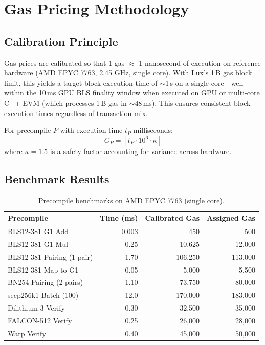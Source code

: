 \section{Gas Pricing Methodology}
\label{sec:gas}

\subsection{Calibration Principle}

Gas prices are calibrated so that 1 gas $\approx$ 1 nanosecond of execution on reference hardware (AMD EPYC 7763, 2.45 GHz, single core). With Lux's 1\,B gas block limit, this yields a target block execution time of $\sim$1\,s on a single core---well within the 10\,ms GPU BLS finality window when executed on GPU or multi-core C++ EVM (which processes 1\,B gas in $\sim$48\,ms). This ensures consistent block execution times regardless of transaction mix.

\begin{definition}
For precompile $P$ with execution time $t_P$ milliseconds:
\begin{equation}
    G_P = \left\lfloor t_P \cdot 10^6 \cdot \kappa \right\rfloor
\end{equation}
where $\kappa = 1.5$ is a safety factor accounting for variance across hardware.
\end{definition}

\subsection{Benchmark Results}

\begin{table}[H]
\centering
\caption{Precompile benchmarks on AMD EPYC 7763 (single core).}
\label{tab:benchmarks}
\begin{tabular}{lrrr}
\toprule
\textbf{Precompile} & \textbf{Time (ms)} & \textbf{Calibrated Gas} & \textbf{Assigned Gas} \\
\midrule
BLS12-381 G1 Add & 0.003 & 450 & 500 \\
BLS12-381 G1 Mul & 0.25 & 10,625 & 12,000 \\
BLS12-381 Pairing (1 pair) & 1.70 & 106,250 & 113,000 \\
BLS12-381 Map to G1 & 0.05 & 5,000 & 5,500 \\
BN254 Pairing (2 pairs) & 1.10 & 73,750 & 80,000 \\
secp256k1 Batch (100) & 12.0 & 170,000 & 183,000 \\
Dilithium-3 Verify & 0.30 & 32,500 & 35,000 \\
FALCON-512 Verify & 0.25 & 26,000 & 28,000 \\
Warp Verify & 0.40 & 45,000 & 50,000 \\
\bottomrule
\end{tabular}
\end{table}

